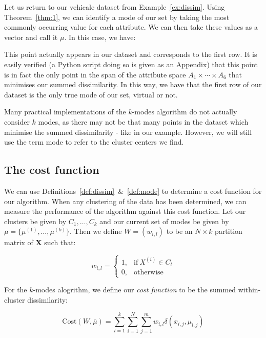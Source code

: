 \begin{example}\label{ex:mode}
    Let us return to our vehicale dataset from Example~\ref{ex:dissim}. Using 
    Theorem~\ref{thm:1}, we can identify a mode of our set by taking the most 
    commonly occurring value for each attribute. We can then take these values
    as a vector and call it \(\mu\). In this case, we have:

    

    This point actually appears in our dataset and corresponds to the first row.
    It is easily verified (a Python script doing so is given as an Appendix)
    that this point is in fact the only point in the span of the attribute space
    \(A_1 \times \cdots \times A_6\) that minimises our summed dissimilarity. In
    this way, we have that the first row of our dataset is the only true mode of
    our set, virtual or not.
\end{example}

\begin{remark}
    Many practical implementations of the \(k\)-modes algorithm do not actually
    consider \(k\) modes, as there may not be that many points in the dataset
    which minimise the summed dissimilarity \-- like in our example. However, we
    will still use the term mode to refer to the cluster centers we find.
\end{remark}

\subsection{The cost function}\label{subsec:cost}

We can use Definitions~\ref{def:dissim}~\&~\ref{def:mode} to determine a cost 
function for our algorithm. When any clustering of the data has been determined,
we can measure the performance of the algorithm against this cost function. Let
our clusters be given by \(C_1, \ldots, C_k\) and our current set of modes be
given by \(\bar{\mu} = \{\mu^{(1)}, \ldots, \mu^{(k)}\}\). Then we define \(W =
(w_{i, l})\) to be an \(N \times k\) partition matrix of \textbf{X} such that:

\[ 
    w_{i,l} = \begin{cases}
                1, & \text{if} \ X^{(i)} \in C_l \\
                0, & \text{otherwise}
              \end{cases}
\]

\begin{definition}\label{def:cost}
    For the \(k\)-modes alogrithm, we define our \emph{cost function} to be the
    summed within-cluster dissimilarity:

    \[
        \text{Cost}(W, \bar{\mu}) = \sum_{l=1}^{k} \sum_{i=1}^{N} \sum_{j=1}^{m}
        w_{i,l} \delta(x_{i,j}, \mu_{l,j})
    \]
\end{definition}


